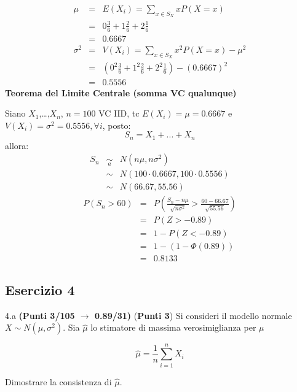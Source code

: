 \documentclass[
  11pt,
]{book}
\theoremstyle{mytheoremstyle}
\theoremstyle{mydefstyle}
\newenvironment{sol}
  {
  \begin{tcolorbox}[enhanced,breakable,arc=0.1mm,boxrule=1pt,colback=white,colframe=iblue,
  title=\bf \fontfamily{lmss}\selectfont \hspace{.5 cm} Soluzione,drop fuzzy shadow]

}{
\end{tcolorbox}
  }
\begin{document}
\begin{sol}
\begin{eqnarray*} \mu &=& E(X_i) = \sum_{x\in S_X}x P(X=x)\\ 
 &=&  0  \frac { 3 }{ 6 }+ 1  \frac { 2 }{ 6 }+ 2  \frac { 1 }{ 6 } \\ 
            &=& 0.6667 \\ 
 \sigma^2 &=& V(X_i) = \sum_{x\in S_X}x^2 P(X=x)-\mu^2\\ 
 &=&\left(  0  ^2\frac { 3 }{ 6 }+ 1  ^2\frac { 2 }{ 6 }+ 2  ^2\frac { 1 }{ 6 } \right)-( 0.6667 )^2\\ 
            &=& 0.5556 
\end{eqnarray*}
\textbf{Teorema del Limite Centrale (somma VC qualunque)}

Siano \(X_1\),\ldots,\(X_n\), \(n=100\) VC IID, tc \(E(X_i)=\mu=0.6667\) e \(V(X_i)=\sigma^2=0.5556,\forall i\), posto:
\[
      S_n = X_1 + ... + X_n
      \]
allora:\begin{eqnarray*}
  S_n & \mathop{\sim}\limits_{a}& N(n\mu,n\sigma^2) \\
     &\sim & N(100\cdot0.6667,100\cdot0.5556) \\
     &\sim & N(66.67,55.56) 
  \end{eqnarray*}\begin{eqnarray*}
      P( S_n   >   60 ) 
        &=& P\left(  \frac { S_n  -  n\mu }{ \sqrt{n\sigma^2} }  >  \frac { 60  -  66.67 }{\sqrt{ 55.56 }} \right)  \\
                 &=& P\left(  Z   >   -0.89 \right) \\    &=& 1-P(Z< -0.89 )\\ 
                 &=&  1-(1-\Phi( 0.89 )) \\ &=&  0.8133 
      \end{eqnarray*}

\end{sol}

\subsection{Esercizio 4}\label{esercizio-4-34}

4.a \textbf{(Punti 3/105 \(\rightarrow\) 0.89/31)} (\textbf{Punti 3}) Si consideri il modello normale \(X\sim N(\mu,\sigma^2)\). Sia \(\hat\mu\) lo stimatore di massima verosimiglianza per \(\mu\)

\[
  \hat\mu = \frac 1n \sum_{i=1}^n X_i
\]

Dimostrare la consistenza di \(\hat\mu\).
\end{document}
